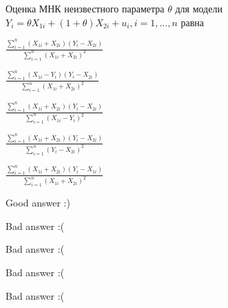 
\begin{question}
Оценка МНК неизвестного параметра \(\theta\) для модели \(Y_i = \theta X_{1i} + (1 + \theta) X_{2i} + u_i, i = 1, \ldots, n\) равна
\begin{answerlist}
  \item \(\frac{\sum_{i=1}^n (X_{1i} + X_{2i}) (Y_i - X_{2i}) }{\sum_{i=1}^n (X_{1i} + X_{2i})^2 }\)
  \item \(\frac{\sum_{i=1}^n (X_{1i} - Y_{i}) (Y_i - X_{2i}) }{\sum_{i=1}^n (X_{1i} + X_{2i})^2 }\)
  \item \(\frac{\sum_{i=1}^n (X_{1i} + X_{2i}) (Y_i - X_{2i}) }{\sum_{i=1}^n (X_{1i} - Y_{i})^2 }\)
  \item \(\frac{\sum_{i=1}^n (X_{1i} + X_{2i}) (Y_i - X_{2i}) }{\sum_{i=1}^n (Y_{i} - X_{2i})^2 }\)
  \item \(\frac{\sum_{i=1}^n (X_{1i} + X_{2i}) (Y_i - X_{1i}) }{\sum_{i=1}^n (X_{1i} + X_{2i})^2 }\)
\end{answerlist}
\end{question}

\begin{solution}
\begin{answerlist}
  \item Good answer :)
  \item Bad answer :(
  \item Bad answer :(
  \item Bad answer :(
  \item Bad answer :(
\end{answerlist}
\end{solution}

